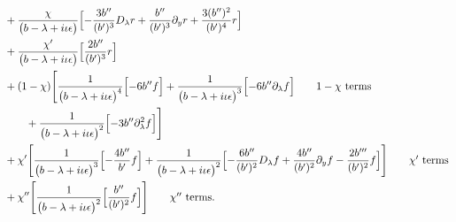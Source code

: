 \documentclass[reqno,11pt]{amsart}
\numberwithin{equation}{section}
\newcommand{\p}{\partial}
\newcommand{\D}{D_\lambda}
\numberwithin{equation}{section} %
\begin{document}
\begin{enumerate}
\begin{align}
&+\frac{\chi}{\bigl(b -\lambda+i\iota\epsilon\bigr)}\Bigl[- \frac{3 b'' }{(b' )^{3}} \D r+\frac{b'' }{(b' )^{3}} \p_y r+\frac{3 (b'' )^{2}}{(b' )^{4}} r\Bigr]\notag\\
&+\frac{\chi'}{\bigl(b -\lambda+i\iota\epsilon\bigr)}\Bigl[\frac{2 b'' }{(b' )^{3}} r\Bigr]\notag\\
&+(1-\chi)\Bigg[\frac{1}{\bigl(b -\lambda+i\iota\epsilon\bigr)^{4}}\Bigl[- 6 b''  f\Bigr]+\frac{1}{\bigl(b -\lambda+i\iota\epsilon\bigr)^{3}}\Bigl[- 6 b''  \p_\lambda f\Bigr]\tag*{\text{$1-\chi$ terms}}\\
&\qquad+\frac{1}{\bigl(b -\lambda+i\iota\epsilon\bigr)^{2}}\Bigl[- 3 b''  \p_\lambda^2 f\Bigr]\Bigg]\notag\\
&+\chi'\Bigg[\frac{1}{\bigl(b -\lambda+i\iota\epsilon\bigr)^{3}}\Bigl[- \frac{4 b'' }{b' } f\Bigr]+\frac{1}{\bigl(b -\lambda+i\iota\epsilon\bigr)^{2}}\Bigl[- \frac{6 b'' }{(b' )^{2}} \D f+\frac{4 b'' }{(b' )^{2}} \p_y f- \frac{2 b''' }{(b' )^{2}} f\Bigr]\Bigg]\tag*{\text{$\chi'$ terms}}\\
&+\chi''\Bigg[\frac{1}{\bigl(b -\lambda+i\iota\epsilon\bigr)^{2}}\Bigl[\frac{b'' }{(b' )^{2}} f\Bigr]\Bigg]\tag*{\text{$\chi''$ terms}}.\\
&
\end{align}


\end{enumerate}
\end{document}
